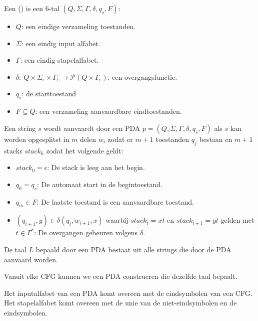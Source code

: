 \documentclass[main.tex]{subfiles}
\begin{document}
\begin{de}
  Een  () is een $6$-tal $(Q,\Sigma,\Gamma,\delta,q_{s},F)$:
  \begin{itemize}
  \item $Q$: een eindige verzameling toestanden.
  \item $\Sigma$: een eindig input alfabet.
  \item $\Gamma$: een eindig stapelalfabet.
  \item $\delta:\ Q\times \Sigma_{\epsilon} \times \Gamma_{\epsilon} \rightarrow \mathcal{P}(Q\times \Gamma_{\epsilon})$: een overgangsfunctie.
  \item $q_{s}$: de starttoestand
  \item $F\subseteq Q$: een verzameling aanvaardbare eindtoestanden.
  \end{itemize}
\end{de}

\begin{de}
  Een string $s$ wordt aanvaardt door een PDA $p = (Q,\Sigma,\Gamma,\delta,q_{s},F)$ als $s$ kan worden opgesplitst in $m$ delen $w_{i}$ zodat er $m+1$ toestanden $q_{j}$ bestaan en $m+1$ stacks $stack_{k}$ zodat het volgende geldt:
  \begin{itemize}
  \item $stack_{0} = \epsilon$: De stack is leeg aan het begin.
  \item $q_{0} = q_{s}$: De automaat start in de begintoestand.
  \item $q_{m} \in F$: De laatste toestand is een aanvaardbare toestand.
  \item $(q_{i+1}, y) \in \delta(q_{i}, w_{i+1}, x)$ waarbij $stack_{i} = xt$ en $stack_{i+1} = yt$ gelden met $t\in \Gamma^{*}$: De overgangen gebeuren volgens $\delta$.
  \end{itemize}
\end{de}

\begin{de}
  De taal $L$ bepaald door een PDA bestaat uit alle strings die door de PDA aanvaard worden.
\end{de}

\begin{lem}
  \label{lem:cfg-naar-pda}
  Vanuit elke CFG kunnen we een PDA construeren die dezelfde taal bepaalt.
\end{lem}

\begin{opm}
  Het inputalfabet van een PDA komt overeen met de eindsymbolen van een CFG.
  Het stapelalfabet komt overeen met de unie van de niet-eindsymbolen en de eindsymbolen.
\end{opm}
\end{document}

